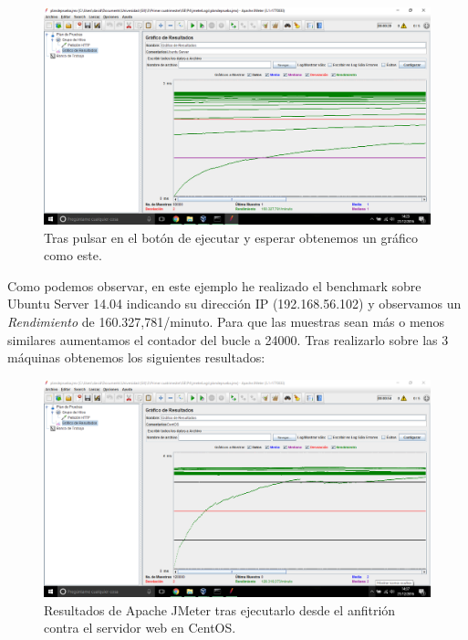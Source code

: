 \begin{figure}[H]
	\centering
	\includegraphics[scale=0.3]{jmeter6.png}
	\caption{Tras pulsar en el botón de ejecutar y esperar obtenemos un gráfico como este.}
\end{figure}

Como podemos observar, en este ejemplo he realizado el benchmark sobre Ubuntu Server 14.04 indicando su dirección IP (192.168.56.102) y observamos un \textit{Rendimiento} de 160.327,781/minuto. Para que las muestras sean más o menos similares aumentamos el contador del bucle a 24000. Tras realizarlo sobre las 3 máquinas obtenemos los siguientes resultados:

\begin{figure}[H]
	\centering
	\includegraphics[scale=0.3]{jmeterCentOS.png}
	\caption{Resultados de Apache JMeter tras ejecutarlo desde el anfitrión contra el servidor web en CentOS.}
\end{figure}

